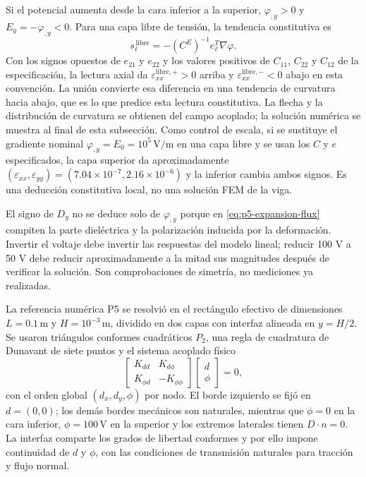 Si el potencial aumenta desde la cara inferior a la superior,
$\varphi_{,y}>0$ y $E_y=-\varphi_{,y}<0$. Para una capa libre de tensión,
la tendencia constitutiva es
\begin{equation}
  s_\ell^{\,\mathrm{libre}}=-(C^E)^{-1}e_\ell^T\nabla\varphi.
  \label{eq:p5-expansion-free-strain}
\end{equation}
Con los signos opuestos de $e_{21}$ y $e_{22}$ y los valores positivos de
$C_{11}$, $C_{22}$ y $C_{12}$ de la especificación, la lectura axial da
$\varepsilon_{xx}^{\mathrm{libre},+}>0$ arriba y
$\varepsilon_{xx}^{\mathrm{libre},-}<0$ abajo en esta convención. La unión
convierte esa diferencia en una tendencia de curvatura hacia abajo, que es lo
que predice esta lectura constitutiva. La flecha y la distribución de curvatura se obtienen del campo acoplado; la solución numérica se muestra al final de esta subsección.
Como control de escala, si se sustituye el gradiente nominal
$\varphi_{,y}=E_0=10^5\,\mathrm{V}/\mathrm{m}$ en una capa libre y se usan
los $C$ y $e$ especificados, la capa superior da aproximadamente
$(\varepsilon_{xx},\varepsilon_{yy})=(7.04\times10^{-7},
2.16\times10^{-6})$ y la inferior cambia ambos signos. Es una deducción
constitutiva local, no una solución FEM de la viga.

El signo de $D_y$ no se deduce solo de $\varphi_{,y}$ porque en
\eqref{eq:p5-expansion-flux} compiten la parte dieléctrica y la polarización
inducida por la deformación. Invertir el voltaje debe invertir las respuestas
del modelo lineal; reducir 100 V a 50 V debe reducir aproximadamente a la
mitad sus magnitudes después de verificar la solución. Son comprobaciones de
simetría, no mediciones ya realizadas.

La referencia numérica P5 se resolvió en el rectángulo efectivo
de dimensiones \(L=0.1\,\mathrm{m}\) y \(H=10^{-3}\,\mathrm{m}\), dividido en
dos capas con interfaz alineada en \(y=H/2\). Se usaron triángulos
conformes cuadráticos \(P_2\), una regla de cuadratura de Dunavant de siete
puntos y el sistema acoplado físico
\[
\begin{bmatrix}K_{dd}&K_{d\phi}\\K_{\phi d}&-K_{\phi\phi}\end{bmatrix}
\begin{bmatrix}d\\\phi\end{bmatrix}=0,
\]
con el orden global \((d_x,d_y,\phi)\) por nodo. El borde izquierdo se fijó
en \(d=(0,0)\); los demás bordes mecánicos son naturales, mientras que
\(\phi=0\) en la cara inferior, \(\phi=100\,\mathrm{V}\) en la superior y los
extremos laterales tienen \(D\!\cdot n=0\). La interfaz comparte los grados
de libertad conformes y por ello impone continuidad de \(d\) y \(\phi\), con
las condiciones de transmisión naturales para tracción y flujo normal.

